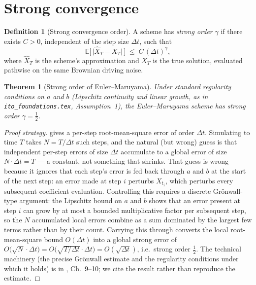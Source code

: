 \documentclass[11pt]{article}
\newcommand{\E}{\mathbb{E}}
\newcommand{\drift}{a}
\newcommand{\diff}{b}
\theoremstyle{plain}
\newtheorem{theorem}{Theorem}
\theoremstyle{definition}
\newtheorem{definition}{Definition}
\theoremstyle{remark}
\begin{document}
\section{Strong convergence}

\begin{definition}[Strong convergence order]
A scheme has \emph{strong order} $\gamma$ if there exists $C>0$,
independent of the step size $\Delta t$, such that
\[
   \E\Big[\,\big|\hat X_T - X_T\big|\,\Big] \;\le\; C\,(\Delta t)^{\gamma},
\]
where $\hat X_T$ is the scheme's approximation and $X_T$ is the true
solution, evaluated pathwise on the same Brownian driving noise.
\end{definition}

\begin{theorem}[Strong order of Euler--Maruyama]\label{thm:em-order}
Under standard regularity conditions on $\drift$ and $\diff$
(Lipschitz continuity and linear growth, as in
\texttt{ito\_foundations.tex}, Assumption~1), the Euler--Maruyama
scheme has strong order $\gamma = \tfrac12$.
\end{theorem}

\begin{proof}[Proof strategy]
 gives a per-step root-mean-square error of
order $\Delta t$. Simulating to time $T$ takes $N=T/\Delta t$ such
steps, and the natural (but wrong) guess is that independent
per-step errors of size $\Delta t$ accumulate to a global error of
size $N\cdot\Delta t = T$ --- a constant, not something that shrinks.
That guess is wrong because it ignores that each step's error is fed
back through $\drift$ and $\diff$ at the start of the next
step: an error made at step $i$ perturbs $X_{t_i}$, which perturbs
every subsequent coefficient evaluation. Controlling this requires a
discrete Gr\"onwall-type argument: the Lipschitz bound on $\drift$
and $\diff$ shows that an error present at step $i$ can grow by at
most a bounded multiplicative factor per subsequent step, so the
$N$ accumulated local errors combine as a sum dominated by the
largest few terms rather than by their count. Carrying this through
converts the local root-mean-square bound $O(\Delta t)$ into a global
strong error of $O\big(\sqrt{N}\cdot\Delta t\big) = O\big(\sqrt{T/\Delta
t}\cdot\Delta t\big) = O(\sqrt{\Delta t})$, i.e.\ strong order
$\tfrac12$. The technical machinery (the precise Gr\"onwall estimate
and the regularity conditions under which it holds) is in
, Ch.~9--10; we cite the result rather than
reproduce the estimate.
\end{proof}
\end{document}
